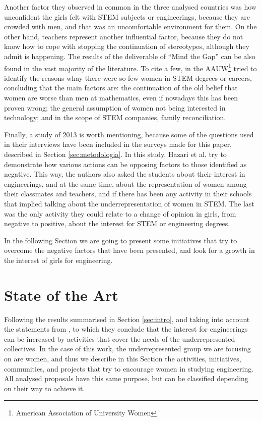\documentclass[journal,transmag]{IEEEtran}
\begin{document}
Another factor they observed in common in the three analysed countries was how unconfident the girls felt with STEM subjects or engineerings, because they are crowded with men, and that was an uncomfortable environment for them. On the other hand, teachers represent another influential factor, because they do not know how to cope with stopping the continuation of stereotypes, although they admit is happening. The results of the deliverable of ``Mind the Gap'' can be also found in the vast majority of the literature. To cite a few, in \cite{hill2010so} the AAUW\footnote{American Association of University Women} tried to identify the reasons whay there were so few women in STEM degrees or careers, concluding that the main factors are: the continuation of the old belief that women are worse than men at mathematics, even if nowadays this has been proven wrong; the general assumption of women not being interested in technology; and in the scope of STEM companies, family reconciliation.

Finally, a study of 2013 \cite{hazari2013factors} is worth mentioning, because some of the questions used in their interviews have been included in the surveys made for this paper, described in Section \ref{sec:metodologia}. In this study, Hazari et al. try to demonstrate how various actions can be opposing factors to those identified as negative. This way, the authors also asked the students about their interest in engineerings, and at the same time, about the representation of women among their classmates and teachers, and if there has been any activity in their schools that implied talking about the underrepresentation of women in STEM. The last was the only activity they could relate to a change of opinion in girls, from negative to positive, about the interest for STEM or engineering degrees.

In the following Section we are going to present some initiatives that try to overcome the negative factors that have been presented, and look for a growth in the interest of girls for engineering.

\section{State of the Art}
\label{sec:EdA}

Following the results summarised in Section \ref{sec:intro}, and taking into account the statements from \cite{everis2012}, to which they conclude that the interest for engineerings can be increased by activities that cover the needs of the underrepresented collectives. In the case of this work, the underrepresented group we are focusing on are women, and thus we describe in this Section the activities, initiatives, communities, and projects that try to encourage women in studying engineering. All analysed proposals have this same purpose, but can be classified depending on their way to achieve it.
\end{document}

